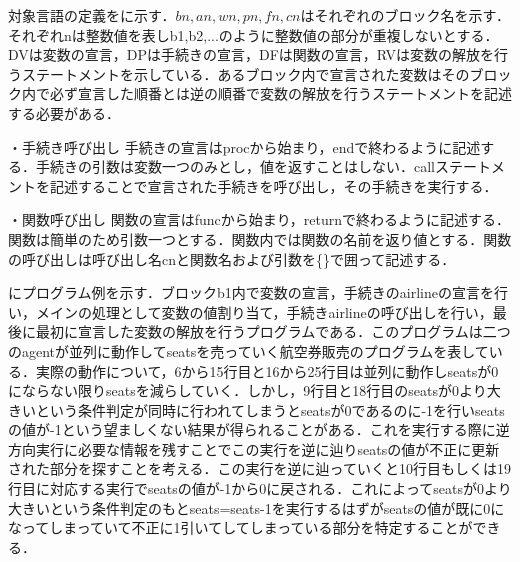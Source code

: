 \documentclass[submit,PRO]{ipsj}
\begin{document}
対象言語の定義をに示す．$bn,an,wn,pn,fn,cn$はそれぞれのブロック名を示す．それぞれnは整数値を表しb1,b2,...のように整数値の部分が重複しないとする．DVは変数の宣言，DPは手続きの宣言，DFは関数の宣言，RVは変数の解放を行うステートメントを示している．あるブロック内で宣言された変数はそのブロック内で必ず宣言した順番とは逆の順番で変数の解放を行うステートメントを記述する必要がある．

・手続き呼び出し  手続きの宣言はprocから始まり，endで終わるように記述する．手続きの引数は変数一つのみとし，値を返すことはしない．callステートメントを記述することで宣言された手続きを呼び出し，その手続きを実行する．

・関数呼び出し  関数の宣言はfuncから始まり，returnで終わるように記述する．関数は簡単のため引数一つとする．関数内では関数の名前を返り値とする．関数の呼び出しは呼び出し名cnと関数名および引数を\{\}で囲って記述する．

にプログラム例を示す．ブロックb1内で変数の宣言，手続きのairlineの宣言を行い，メインの処理として変数の値割り当て，手続きairlineの呼び出しを行い，最後に最初に宣言した変数の解放を行うプログラムである．このプログラムは二つのagentが並列に動作してseatsを売っていく航空券販売のプログラムを表している．実際の動作について，6から15行目と16から25行目は並列に動作しseatsが0にならない限りseatsを減らしていく．しかし，9行目と18行目のseatsが0より大きいという条件判定が同時に行われてしまうとseatsが0であるのに-1を行いseatsの値が-1という望ましくない結果が得られることがある．これを実行する際に逆方向実行に必要な情報を残すことでこの実行を逆に辿りseatsの値が不正に更新された部分を探すことを考える．この実行を逆に辿っていくと10行目もしくは19行目に対応する実行でseatsの値が-1から0に戻される．これによってseatsが0より大きいという条件判定のもとseats=seats-1を実行するはずがseatsの値が既に0になってしまっていて不正に1引いてしてしまっている部分を特定することができる．
\end{document}

